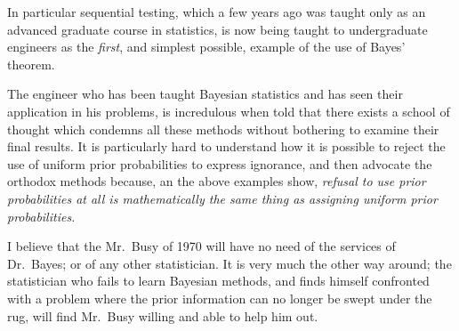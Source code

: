 \documentclass[12pt]{article}
\begin{document}
In particular sequential testing, which a few years ago was taught
only as an advanced graduate course in statistics, is now being taught
to undergraduate engineers as the \emph{first}, and simplest possible, example of
the use of Bayes' theorem.

The engineer who has been taught Bayesian statistics and has
seen their application in his problems, is incredulous when told that
there exists a school of thought which condemns all these methods without
bothering to examine their final results. It is particularly hard to
understand how it is possible to reject the use of uniform prior
probabilities to express ignorance, and then advocate the orthodox
methods because, an the above examples show, \emph{refusal to use prior
probabilities at all is mathematically the same thing as assigning uniform prior probabilities.}

I believe that the Mr.~Busy of 1970 will have no need of the
services of Dr.~Bayes; or of any other statistician. It is very much
the other way around; the statistician who fails to learn Bayesian
methods, and finds himself confronted with a problem where the
prior information can no longer be swept under the rug, will find
Mr.~Busy willing and able to help him out.



\end{document}
